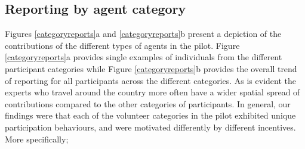 \documentclass[letterpaper]{article} %
\begin{document}
\subsection{Reporting by agent category}
Figures \ref{categoryreports}a and \ref{categoryreports}b present a depiction of the contributions of the different types of agents in the pilot. Figure \ref{categoryreports}a provides single examples of individuals from the different participant categories while Figure \ref{categoryreports}b provides the overall trend of reporting for all participants across the different categories. As is evident the experts who travel around the country more often have a wider spatial spread of contributions compared to the other categories of participants. In general, our findings were that each of the volunteer categories in the pilot exhibited unique participation behaviours, and were motivated differently by different incentives. More specifically;
\end{document}
